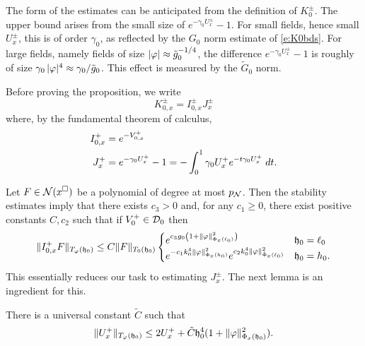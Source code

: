 The form of the estimates  can be anticipated from the definition of
$K_0^\pm$.
The upper bound arises from the small size of
$e^{-\gamma_0U_x^\pm}-1$.  For small fields, hence small $U_x^\pm$, this is of order $\gamma_0$,
as reflected by the $G_0$ norm estimate of \eqref{e:K0bds}.
For large fields, namely fields of size $|\varphi| \approx \tilde{g}_{0}^{-1/4}$, the difference
$e^{-\gamma_0U_x^\pm}-1$ is roughly of size $\gamma_0\,|\varphi|^4 \approx \gamma_0/\tilde{g}_0$.
This effect is measured by the $\tilde G_0$ norm.

Before proving the proposition, we write
\begin{equation}
K^\pm_{0,x} = I^\pm_{0,x} J^\pm_x
  \label{e:KIJ}
\end{equation}
where, by the fundamental theorem of calculus,
\begin{align}
    I^+_{0,x} &= e^{-V^+_{0,x}} \\
    J^+_x
    &= e^{-\gamma_0U^+_x} - 1
    = - \int_0^{1} \gamma_0 U^+_x e^{-t \gamma_0 U^+_x} \; dt.
\label{e:J}
\end{align}

Let $F \in \mathcal{N}(x^\square)$ be a polynomial of degree at most $p_{\mathcal{N}}$.
Then the stability estimates \cite[\eqref{IE-e:Iupper-a}--\eqref{IE-e:Iupper-b}]{BS-rg-IE}
imply that there exists $c_3 > 0$ and, for any $c_1 \geq 0$,
there exist positive constants $C, c_2$ such that
if $V_0^+ \in \mathcal{D}_0$ then
\begin{equation}
\label{e:Iupper}
\|I^+_{0,x} F\|_{T_\varphi(\mathfrak{h}_0)}
  \leq
C \|F\|_{T_0(\mathfrak{h}_0)}
\begin{cases}
  e^{c_3 g_0 \left(1 + \|\varphi\|^2_{\Phi_x(\ell_0)}\right)}
    & \mathfrak{h}_0 = \ell_0 \\
  e^{-c_1 k_0^4 \|\varphi\|^2_{\Phi_x(h_0)}} e^{c_2 k_0^4 \|\varphi\|^2_{\tilde\Phi_x(\ell_0)}}
    & \mathfrak{h}_0 = h_0.
\end{cases}
\end{equation}
This essentially reduces our task to estimating $J^\pm_x$.
The next lemma is an ingredient for this.

\begin{lemma}
\label{lem:FFnull-loc}
There is a universal constant $\tilde C$ such that
\begin{equation}
\label{e:FFnull}
\|U^+_x\|_{T_\varphi(\mathfrak{h}_0)}
  \leq
2 U^+_x + \tilde C \mathfrak{h}_0^4 (1 + \|\varphi\|^2_{\Phi_x(\mathfrak{h}_0)}).
\end{equation}
\end{lemma}

